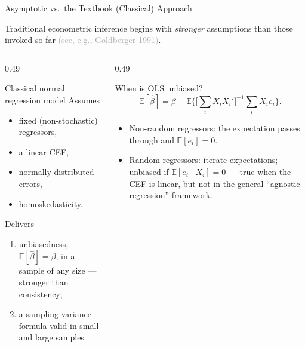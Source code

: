 \documentclass[aspectratio=169,11pt]{beamer}
\newcommand{\E}{\mathbb{E}}
\newcommand{\Src}[1]{{\scriptsize\textcolor{DarkGray}{#1}}}
\begin{document}
\begin{frame}{Asymptotic vs.\ the Textbook (Classical) Approach}
\small

Traditional econometric inference begins with \emph{stronger} assumptions
than those invoked so far \Src{(see, e.g., Goldberger 1991)}.

\medskip

\begin{columns}[T]
\begin{column}{0.49\textwidth}
\begin{block}{Classical normal regression model}
Assumes
\begin{itemize}
    \item fixed (non-stochastic) regressors,
    \item a linear CEF,
    \item normally distributed errors,
    \item homoskedasticity.
\end{itemize}
Delivers
\begin{enumerate}
    \item unbiasedness, $\E[\hat\beta]=\beta$, in a sample of any size ---
    stronger than consistency;
    \item a sampling-variance formula valid in small and large samples.
\end{enumerate}
\end{block}
\end{column}
\begin{column}{0.49\textwidth}
\begin{block}{When is OLS unbiased?}
\[
\E[\hat\beta]
= \beta+\E\Big\{\Big[\sum_iX_iX_i'\Big]^{-1}\sum_iX_ie_i\Big\}.
\]
\begin{itemize}
    \item Non-random regressors: the expectation passes through and
    $\E[e_i]=0$.
    \item Random regressors: iterate expectations; unbiased if
    $\E[e_i\mid X_i]=0$ --- true when the CEF is linear, but \alert{not} in
    the general ``agnostic regression'' framework.
\end{itemize}
\end{block}
\end{column}
\end{columns}

\end{frame}
\end{document}
